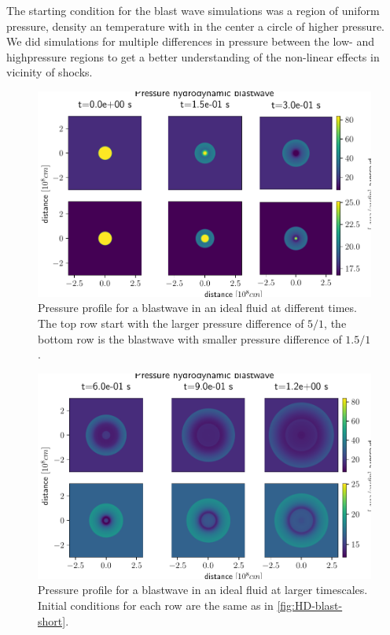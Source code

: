 
The starting condition for the blast wave simulations was a region of uniform pressure, density an temperature with in the center a circle of higher pressure.
We did simulations for multiple differences in pressure between the low- and highpressure regions to get a better understanding of the non-linear effects in vicinity of shocks.
	
\begin{figure}[H]
	\centering
	\includegraphics[width=\linewidth]{images/HD-blast-prs-1.pdf}
	\caption{Pressure profile for a blastwave in an ideal fluid at different times. The top row start with the larger pressure difference of $5/1$, the bottom row is the blastwave with smaller pressure difference of $1.5/1$.}
	\label{fig:HD-blast-short}
\end{figure}

\begin{figure}[H]
	\centering
	\includegraphics[width=\linewidth]{images/HD-blast-prs-2.pdf}
	\caption{Pressure profile for a blastwave in an ideal fluid at larger timescales. Initial conditions for each row are the same as in \autoref{fig:HD-blast-short}.}
	\label{fig:HD-blast-long}
\end{figure}

